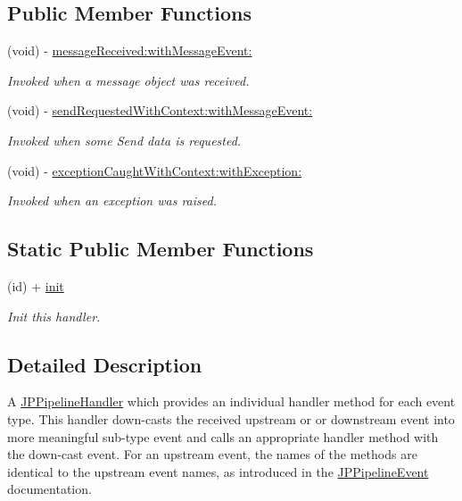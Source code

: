 \subsection*{Public Member Functions}
\begin{DoxyCompactItemize}
\item 
(void) -\/ \hyperlink{a00038_ab7563b8931ff4b65d1419757748dbf86}{messageReceived:withMessageEvent:}
\begin{DoxyCompactList}\small\item\em Invoked when a message object was received. \item\end{DoxyCompactList}\item 
(void) -\/ \hyperlink{a00038_a4ea48ce584b89c8c2c611833a8da18ee}{sendRequestedWithContext:withMessageEvent:}
\begin{DoxyCompactList}\small\item\em Invoked when some Send data is requested. \item\end{DoxyCompactList}\item 
(void) -\/ \hyperlink{a00038_aa349318a897432c440c54ee2483d9e6c}{exceptionCaughtWithContext:withException:}
\begin{DoxyCompactList}\small\item\em Invoked when an exception was raised. \item\end{DoxyCompactList}\end{DoxyCompactItemize}
\subsection*{Static Public Member Functions}
\begin{DoxyCompactItemize}
\item 
\hypertarget{a00038_a0b2e233df8e8b95d1e2bbbc9cee8766e}{
(id) + \hyperlink{a00038_a0b2e233df8e8b95d1e2bbbc9cee8766e}{init}}
\label{a00038_a0b2e233df8e8b95d1e2bbbc9cee8766e}

\begin{DoxyCompactList}\small\item\em Init this handler. \item\end{DoxyCompactList}\end{DoxyCompactItemize}


\subsection{Detailed Description}
A \hyperlink{a00029}{JPPipelineHandler} which provides an individual handler method for each event type. This handler down-\/casts the received upstream or or downstream event into more meaningful sub-\/type event and calls an appropriate handler method with the down-\/cast event. For an upstream event, the names of the methods are identical to the upstream event names, as introduced in the \hyperlink{a00023}{JPPipelineEvent} documentation.

